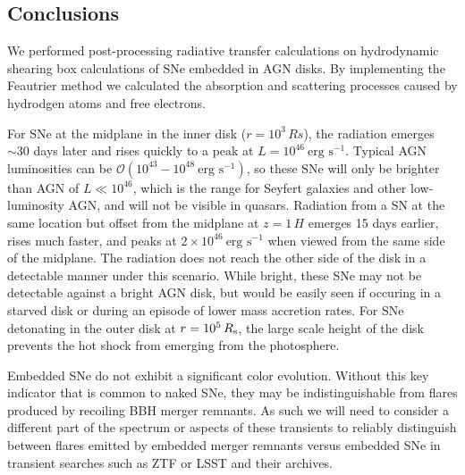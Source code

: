 

\subsection{Conclusions} \label{sec:conclusion}

We performed post-processing radiative transfer calculations on hydrodynamic shearing box calculations of SNe embedded in AGN disks.
By implementing the Feautrier method we calculated the absorption and scattering processes caused by hydrodgen atoms and free electrons.

For SNe at the midplane in the inner disk ($r=10^3\,Rs$), the radiation emerges $\sim30$ days later and rises quickly to a peak at $L=10^{46}\ \text{erg s}^{-1}$.
Typical AGN luminosities can be $\mathcal{O}(10^{43}-10^{48}\ \text{erg s}^{-1})$, so these SNe will only be brighter than AGN of $L\ll10^{46}$, which is the range for Seyfert galaxies and other low-luminosity AGN, and will not be visible in quasars.
Radiation from a SN at the same location but offset from the midplane at $z=1\,H$ emerges 15 days earlier, rises much faster, and peaks at $2 \times 10^{46}\ \text{erg s}^{-1}$ when viewed from the same side of the midplane.
The radiation does not reach the other side of the disk in a detectable manner under this scenario.
While bright, these SNe may not be detectable against a bright AGN disk, but would be easily seen if occuring in a starved disk or during an episode of lower mass accretion rates.
For SNe detonating in the outer disk at $r=10^5\,R_{\rm s}$, the large scale height of the disk prevents the hot shock from emerging from the photosphere.

Embedded SNe do not exhibit a significant color evolution.
Without this key indicator that is common to naked SNe, they may be indistinguishable from flares produced by recoiling BBH merger remnants.
As such we will need to consider a different part of the spectrum or aspects of these transients to reliably distinguish between flares emitted by embedded merger remnants versus embedded SNe in transient searches such as ZTF or LSST and their archives.

